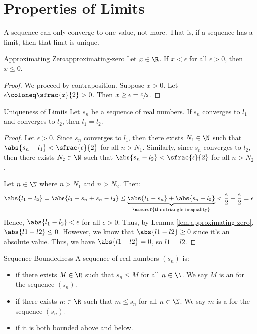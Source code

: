 \section{Properties of Limits}

A sequence can only converge to one value, not more. That is, if a sequence has a limit, then that limit is unique.

\begin{lembox}{Approximating Zero}{approximating-zero}
    Let $x \in \R$. If $x < \epsilon$ for all $\epsilon > 0$, then $x \leq 0$.
    \tcblower
    \begin{proof}
        We proceed by contraposition. Suppose $x > 0$. Let $\epsilon \coloneq \sfrac{x}{2} > 0$. Then $x \geq \epsilon = \sfrac{x}{2}$.
    \end{proof}
\end{lembox}

\begin{thmbox}{Uniqueness of Limits}{}
    Let $s_n$ be a sequence of real numbers. If $s_n$ converges to $l_1$ and converges to $l_2$, then $l_1 = l_2$.
    \tcblower
    \begin{proof}
        Let $\epsilon > 0$. Since $s_n$ converges to $l_1$, then there exists $N_1 \in \N$ such that $\abs{s_n - l_1} < \sfrac{\epsilon}{2}$ for all $n > N_1$. Similarly, since $s_n$ converges to $l_2$, then there exists $N_2 \in \N$ such that $\abs{s_n - l_2} < \sfrac{\epsilon}{2}$ for all $n > N_2$.

        Let $n \in \N$ where $n > N_1$ and $n > N_2$. Then:
        \[ \abs{l_1 - l_2} = \abs{l_1 - s_n + s_n - l_2} \leq \underbrace{\abs{l_1 - s_n} + \abs{s_n - l_2}}_\text{\nameref{thm:triangle-inequality}} < {\frac{\epsilon}{2} + \frac{\epsilon}{2}} = \epsilon \]
        Hence, $\abs{l_1 - l_2} < \epsilon$ for all $\epsilon > 0$. Thus, by Lemma \ref{lem:approximating-zero}, $\abs{l1-l2} \leq 0$. However, we know that $\abs{l1-l2} \geq 0$ since it's an absolute value. Thus, we have $\abs{l1-l2} = 0$, so $l1 = l2$.
    \end{proof}
\end{thmbox}

\begin{dfnbox}{Sequence Boundedness}{}
    A sequence of real numbers $(s_n)$ is:
    \begin{itemize}[noitemsep]
        \item {} if there exists $M \in \R$ such that $s_n \leq M$ for all $n \in \N$. We say $M$ is an  for the sequence $(s_n)$.
        \item {} if there exists $m \in \R$ such that $m \leq s_n$ for all $n \in \N$. We say $m$ is a  for the sequence $(s_n)$.
        \item {} if it is both bounded above and below.
    \end{itemize}
\end{dfnbox}

